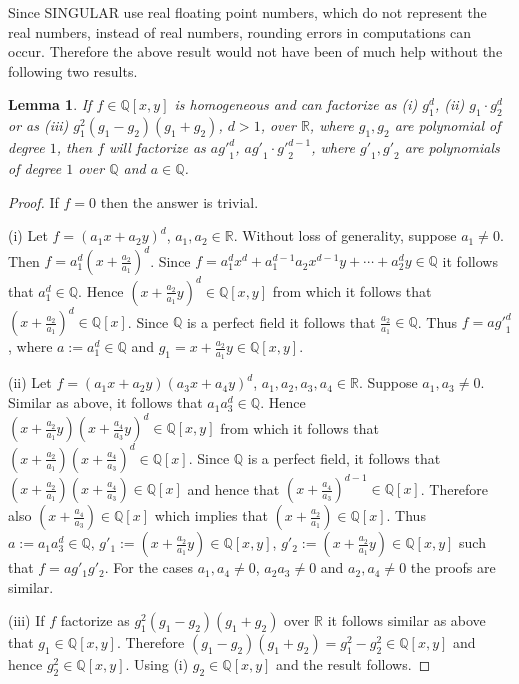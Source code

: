 \documentclass{amsproc}
\begin{document}
Since SINGULAR use real floating point numbers, which do not represent the real numbers, instead of real numbers, rounding errors in computations can occur. Therefore the above result would not have been of much help without the following two results. 
\newtheorem{x^3}[kjet]{Lemma}
\begin{x^3}\label{x^3}
If $f\in\mathbb Q[x,y]$ is homogeneous and can factorize as (i) $g_1^d$, (ii) $g_1\cdot g_2^{d}$ or as  (iii) $g_1^2(g_1-g_2)(g_1+g_2)$, $d>1$, over $\mathbb R$, where $g_1,g_2$ are polynomial of degree $1$, then $f$ will factorize as $a{g'}_1^d$, $a{g'}_1\cdot {g'}_2^{d-1}$, where ${g'}_1,{g'}_2$ are polynomials of degree $1$ over $\mathbb Q$ and $a\in\mathbb Q$.
\end{x^3}
\begin{proof}
If $f=0$ then the answer is trivial.

(i) Let $f=(a_1x+a_2y)^d$, $a_1,a_2\in\mathbb R$. Without loss of generality, suppose $a_1\neq 0$. Then $f=a_1^d(x+\frac{a_2}{a_1})^d$. Since $f= a_1^dx^d+a_1^{d-1}a_2x^{d-1}y+\cdots+a_2^dy\in\mathbb Q$ it follows that $a_1^d\in\mathbb Q$. Hence $(x+\frac{a_2}{a_1}y)^d\in\mathbb Q[x,y]$ from which it follows that $(x+\frac{a_2}{a_1})^d\in\mathbb Q[x]$. Since $\mathbb Q$ is a perfect field it follows that $\frac{a_2}{a_1}\in\mathbb Q$. Thus $f=a{g'}_1^d$, where $a:=a_1^d\in\mathbb Q$ and $g_1=x+\frac{a_2}{a_1}y\in\mathbb Q[x,y]$.

(ii) Let $f=(a_1x+a_2y)(a_3x+a_4y)^{d}$, $a_1,a_2,a_3,a_4\in\mathbb R$. Suppose $a_1,a_3\neq 0$. Similar as above, it follows that $a_1a_3^{d}\in\mathbb Q$. Hence $(x+\frac{a_2}{a_1}y)(x+\frac{a_4}{a_3}y)^d\in\mathbb Q[x,y]$ from which it follows that $(x+\frac{a_2}{a_1})(x+\frac{a_4}{a_3})^d\in\mathbb Q[x]$. Since $\mathbb Q$ is a perfect field, it follows that $(x+\frac{a_2}{a_1})(x+\frac{a_4}{a_3})\in\mathbb Q[x]$ and hence that $(x+\frac{a_4}{a_3})^{d-1}\in\mathbb Q[x]$. Therefore also $(x+\frac{a_4}{a_3})\in\mathbb Q[x]$ which implies that $(x+\frac{a_2}{a_1})\in\mathbb Q[x]$. Thus $a:=a_1a_3^d\in\mathbb Q$, $g'_1:=(x+\frac{a_2}{a_1}y)\in\mathbb Q[x,y]$, $g'_2:=(x+\frac{a_2}{a_1}y)\in\mathbb Q[x,y]$ such that $f=ag'_1g'_2$. For the cases $a_1,a_4\neq 0$, $a_2a_3\neq 0$ and $a_2,a_4\neq 0$ the proofs are similar.

(iii) If $f$ factorize as $g_1^2(g_1-g_2)(g_1+g_2)$ over $\mathbb R$ it follows similar as above that $g_1\in\mathbb Q[x,y]$. Therefore $(g_1-g_2)(g_1+g_2)=g_1^2-g_2^2\in\mathbb Q[x,y]$ and hence $g_2^2\in\mathbb Q[x,y]$. Using (i) $g_2\in\mathbb Q[x,y]$ and the result follows.
\end{proof}
\end{document}
